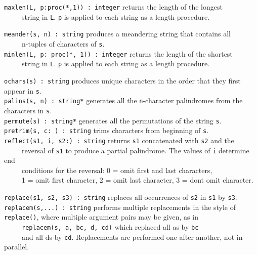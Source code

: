 \texttt{maxlen(L, p:proc({\textquotedbl}*{\textquotedbl},1)) : integer}
returns the length of the longest\\
 \ \ \ \ \ string in \texttt{L}. \texttt{p} is applied to each string as
a {\textquotedbl}length{\textquotedbl} procedure.

\texttt{meander(s, n) : string} produces a
{\textquotedbl}meandering{\textquotedbl} string that contains
all\\
 \ \ \ \ \ n-tuples of characters of \texttt{s}.\\
\texttt{minlen(L, p: proc({\textquotedbl}*{\textquotedbl}, 1)) :
integer} returns the length of the shortest\\
 \ \ \ \ \ string in \texttt{L}. \texttt{p} is applied to each string as
a {\textquotedbl}length{\textquotedbl} procedure.

\texttt{ochars(s) : string} produces unique characters in the order that
they first appear in \texttt{s}.\\
\texttt{palins(s, n) : string*} generates all the \texttt{n}{}-character
palindromes from the characters in
\texttt{s}.\\
\texttt{permute(s) : string*} generates all the permutations of the
string \texttt{s}.\\
\texttt{pretrim(s, c:{\textquotesingle} {\textquotesingle}) : string}
trims characters from beginning of \texttt{s}.\\
\texttt{reflect(s1, i, s2:{\textquotedbl}{\textquotedbl}) : string}
returns \texttt{s1} concatenated with \texttt{s2} and the\\
 \ \ \ \ \ reversal of \texttt{s1} to produce a partial palindrome. The
values of \texttt{i} determine {\textquotedbl}end\\
 \ \ \ \ \ conditions{\textquotedbl} for the reversal: 0 = omit first
and last characters,\\
 \ \ \ \ \ 1 = omit first character, 2 = omit last character, 3 =
don{\textquotesingle}t omit character.

\texttt{replace(s1, s2, s3) : string} replaces all occurrences of
\texttt{s2} in \texttt{s1} by \texttt{s3}.\\
\texttt{replacem(s,...) : string} performs multiple replacements in the style of \texttt{replace()}, where multiple
argument pairs may be given, as in\\
 \ \ \ \ \ \texttt{replacem(s, {\textquotedbl}a{\textquotedbl},
{\textquotedbl}bc{\textquotedbl}, {\textquotedbl}d{\textquotedbl},
{\textquotedbl}cd{\textquotedbl})} which replaced all
a{\textquotesingle}s by
\texttt{{\textquotedbl}bc{\textquotedbl}}\\
\ \ \ \ \ and all d{\textquotesingle}s by
\texttt{{\textquotedbl}cd{\textquotedbl}}. Replacements are performed
one after another, not in parallel.

